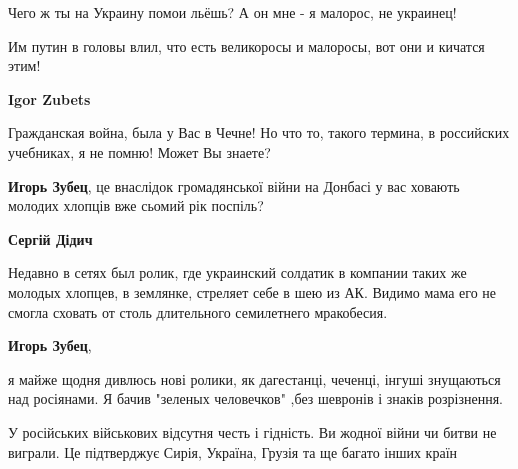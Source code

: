 \begin{itemize}
\begin{itemize}
Чего ж ты на Украину помои льёшь? А он мне - я малорос, не украинец!

Им путин в головы влил, что есть великоросы и малоросы, вот они и кичатся этим!


 
\textbf{Igor Zubets}

Гражданская война, была у Вас в Чечне! Но что то, такого термина, в российских
учебниках, я не помню! Может Вы знаете?

\end{itemize}

 
\textbf{Игорь Зубец}, це внаслідок громадянської війни на Донбасі у вас ховають
молодих хлопців вже сьомий рік поспіль?

\begin{itemize}
 
\textbf{Сергій Дідич} 

Недавно в сетях был ролик, где украинский солдатик в компании таких же молодых
хлопцев, в землянке, стреляет себе в шею из АК. Видимо мама его не смогла
сховать от столь длительного семилетнего мракобесия.


 
\textbf{Игорь Зубец}, 

я майже щодня дивлюсь нові ролики, як дагестанці, чеченці, інгуші знущаються
над росіянами. Я бачив "зеленых человечков" ,без шевронів і знаків розрізнення.

У російських військових відсутня честь і гідність. Ви жодної війни чи битви не
виграли. Це підтверджує Сирія, Україна, Грузія та ще багато інших країн



\end{itemize}
\end{itemize}
